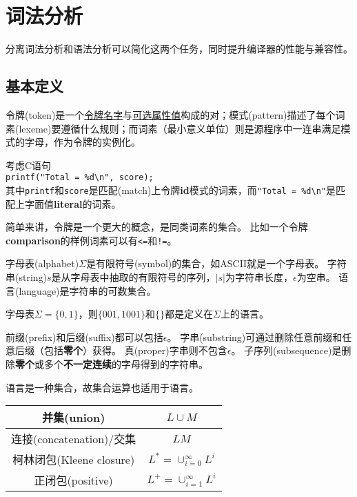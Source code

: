 
\section{词法分析}
分离词法分析和语法分析可以简化这两个任务，同时提升编译器的性能与兼容性。

\subsection{基本定义}
\begin{definition}
令牌(token)是一个\underline{令牌名字}与\underline{可选属性值}构成的对；模式(pattern)描述了每个词素(lexeme)要遵循什么规则；而词素（最小意义单位）则是源程序中一连串满足模式的字母，作为令牌的实例化。
\end{definition}
\begin{example}
考虑C语句\\
 \qquad\qquad\verb'printf("Total = %d\n", score);'\\
其中\verb'printf'和\verb'score'是匹配(match)上令牌\textbf{id}模式的词素，而\verb'"Total = %d\n"'是匹配上字面值\textbf{literal}的词素。
\end{example}
简单来讲，令牌是一个更大的概念，是同类词素的集合。
比如一个令牌\textbf{comparison}的样例词素可以有\texttt{<=}和\texttt{!=}。

\begin{definition}[字母表与语言]
字母表(alphabet)$\Sigma$是有限符号(symbol)的集合，如ASCII就是一个字母表。
字符串(string)$s$是从字母表中抽取的有限符号的序列，$|s|$为字符串长度，$\epsilon$为空串。
语言(language)是字符串的可数集合。
\end{definition}
\begin{example}
字母表$\Sigma=\{0,1\}$，则$\{001,1001\}$和$\{\}$都是定义在$\Sigma$上的语言。
\end{example}

\begin{definition}[字符串术语]
前缀(prefix)和后缀(suffix)都可以包括$\epsilon$。
字串(substring)可通过删除任意前缀和任意后缀（包括\textbf{零个}）获得。
真(proper)字串则不包含$\epsilon$。
子序列(subsequence)是删除\textbf{零个}或多个\textbf{不一定连续}的字母得到的字符串。
\end{definition}

语言是一种集合，故集合运算也适用于语言。
\begin{table}[H]
\centering
\begin{tabular}{|c|c|}\hline
并集(union) & $L\cup M$\\\hline
连接(concatenation)/交集 & $LM$\\\hline
柯林闭包(Kleene closure) & $L^*=\cup_{i=0}^\infty L^i$\\\hline
正闭包(positive) & $L^+=\cup_{i=1}^\infty L^i$\\\hline
\end{tabular}
\end{table}


